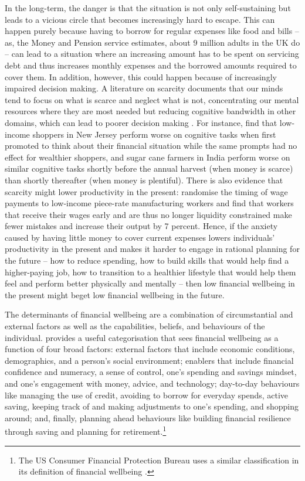 In the long-term, the danger is that the situation is not only self-sustaining
but leads to a vicious circle that becomes increasingly hard to escape. This
can happen purely because having to borrow for regular expenses like food and
bills -- as, the Money and Pension service estimates, about 9 million adults in
the UK do \citep{mps2018building} -- can lead to a situation where an
increasing amount has to be spent on servicing debt and thus increases monthly
expenses and the borrowed amounts required to cover them. In addition, however,
this could happen because of increasingly impaired decision making. A
literature on scarcity documents that our minds tend to focus on what is
scarce and neglect what is not, concentrating our mental resources where they
are most needed but reducing cognitive bandwidth in other domains, which can
lead to poorer decision making \citep{shah2012some, mullainathan2013scarcity,
haushofer2014psychology}. For instance, \citet{mani2013poverty} find that
low-income shoppers in New Jersey perform worse on cognitive tasks when first
promoted to think about their financial situation while the same prompts had no
effect for wealthier shoppers, and sugar cane farmers in India perform worse on
similar cognitive tasks shortly before the annual harvest (when money is
scarce) than shortly thereafter (when money is plentiful). There is also
evidence that scarcity might lower productivity in the present:
\citet{kaur2021financial} randomise the timing of wage payments to low-income
piece-rate manufacturing workers and find that workers that receive their wages
early and are thus no longer liquidity constrained make fewer mistakes and
increase their output by 7 percent. Hence, if the anxiety caused by having
little money to cover current expenses lowers individuals' productivity in the
present and makes it harder to engage in rational planning for the future --
how to reduce spending, how to build skills that would help find a
higher-paying job, how to transition to a healthier lifestyle that would help
them feel and perform better physically and mentally -- then low financial
wellbeing in the present might beget low financial wellbeing in the future.

The determinants of financial wellbeing are a combination of circumstantial and
external factors as well as the capabilities, beliefs, and behaviours of the
individual. \citet{mps2018building} provides a useful categorisation that sees
financial wellbeing as a function of four broad factors: external factors that
include economic conditions, demographics, and a person's social environment;
enablers that include financial confidence and numeracy, a sense of control,
one's spending and savings mindset, and one's engagement with money, advice, and
technology; day-to-day behaviours like managing the use of credit, avoiding to
borrow for everyday spends, active saving, keeping track of and making
adjustments to one's spending, and shopping around; and, finally, planning ahead
behaviours like building financial resilience through saving and planning for
retirement.\footnote{The US Consumer Financial Protection Bureau uses a similar
    classification in its definition of financial wellbeing
\citep{cfpb2015financial}.}


